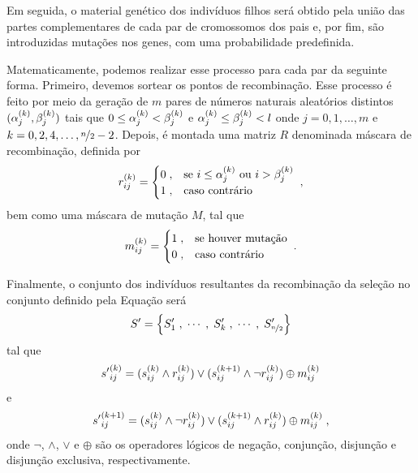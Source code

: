 Em seguida, o material genético dos indivíduos filhos será obtido pela união das partes complementares
de cada par de cromossomos dos pais e, por fim, são introduzidas mutações nos genes, com uma probabilidade predefinida.



Matematicamente, podemos realizar esse processo para cada par da seguinte forma. Primeiro, devemos
sortear os pontos de recombinação. Esse processo é feito por meio da geração de $m$ pares
de números naturais aleatórios distintos $ ({\alpha}^{(k)}_{j}, {\beta}^{(k)}_{j}) $ tais que
$ 0 \leq {\alpha}^{(k)}_{j} < {\beta}^{(k)}_{j} $ e $ {\alpha}^{(k)}_{j} \leq {\beta}^{(k)}_{j} < l $ onde
$ j = 0, 1, \dots, m $ e $ k = 0, 2, 4, \dots, \nicefrac{n}{2} - 2 $.
Depois, é montada uma matriz $R$ denominada máscara de recombinação, definida por
\begin{equation}
  {r}^{(k)}_{ij} =
  \begin{cases}
    0 \;, & \text{se } i \leq {\alpha}^{(k)}_{j} \text{ ou } i > {\beta}^{(k)}_{j} \\
    1 \;, & \text{caso contrário}
  \end{cases}
  \;\mathrm{,}
\end{equation}
bem como uma máscara de mutação $M$, tal que
\begin{equation}
  {m}^{(k)}_{ij} =
  \begin{cases}
    1 \;, & \text{se houver mutação} \\
    0 \;, & \text{caso contrário}
  \end{cases}
  \;\mathrm{.}
\end{equation}

Finalmente, o conjunto dos indivíduos resultantes da recombinação da seleção no conjunto definido
pela Equação  será
\begin{equation}
  S' = \left\{ S'_1\;, \;\cdots\;,  \;S'_k\;, \;\cdots\;, \;S'_{\nicefrac{n}{2}} \right\}
\end{equation}
tal que
\begin{equation}
  {s'}^{(k)}_{ij} = ({s}^{(k)}_{ij} \land {r}^{(k)}_{ij}) \lor ({s}^{(k + 1)}_{ij} \land \lnot {r}^{(k)}_{ij}) \oplus {m}^{(k)}_{ij}
\end{equation}
e
\begin{equation}
  {s'}^{(k + 1)}_{ij} = ({s}^{(k)}_{ij} \land \lnot {r}^{(k)}_{ij}) \lor ({s}^{(k + 1)}_{ij} \land {r}^{(k)}_{ij}) \oplus {m}^{(k)}_{ij} \;\mathrm{,}
\end{equation}
onde $\lnot$, $\land$, $\lor$ e $\oplus$ são os operadores lógicos de negação, conjunção, disjunção e disjunção exclusiva,
respectivamente.

